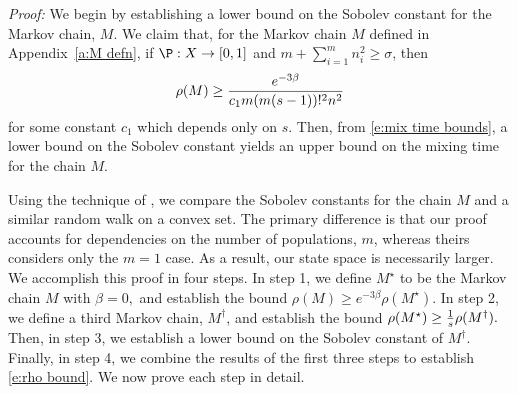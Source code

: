 \noindent\emph{Proof:}
We begin by establishing a lower bound on the Sobolev constant for the Markov chain, $M$. We claim that, for the Markov chain $M$ defined in Appendix~\ref{a:M defn}, if $\P:  \sX\rightarrow [0,1]$ and
$m+\sum_{i=1}^m n_i^2 \geq \sigma$, then
\begin{equation}\label{e:rho bound}
\rho(M)\geq {e^{-3\beta}\over c_1m(m(s-1))!^2 n^2}
\end{equation}
for some constant $c_1$ which depends only on $s$.  Then,  from \eqref{e:mix time bounds}, a lower bound on the Sobolev constant yields an upper bound on the mixing time for the chain $M$. 


Using the technique of \cite{Shah2010}, we compare the Sobolev constants for the chain $M$ and a similar random walk on a convex set. The primary difference is that our proof accounts for dependencies on the number of populations, $m$, whereas theirs considers only the $m=1$ case. As a result, our state space is necessarily larger. 
We accomplish this proof in four steps. In step 1, we define $M^\star$ to be the Markov chain $M$ with $\beta = 0,$ and establish the bound $\rho(M)\geq e^{-3\beta}\rho(M^\star).$ In step 2, we define a third Markov chain, $M^\dag$, and establish the bound $\rho(M^\star)\geq{1\over s}\rho(M^\dag).$ Then, in step 3, we establish a lower bound on the Sobolev constant of $M^\dag.$ Finally, in step 4, we combine the results of the first three steps to establish \eqref{e:rho bound}. 
We now prove each step in detail.

